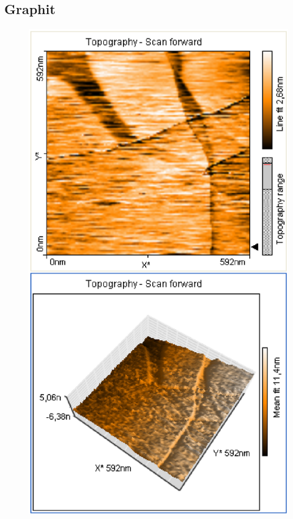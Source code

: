 \documentclass[12pt]{article}
\begin{document}
\subsection{Graphit}

\begin{figure}[H]  
\begin{minipage}{0.4\linewidth}
\centering
\includegraphics[width=0.9\linewidth]{../plot/data/graphit/graphit.eps}
\end{minipage}
\begin{minipage}{0.2\linewidth}
\centering
\end{minipage}

\end{figure}
\end{document}
